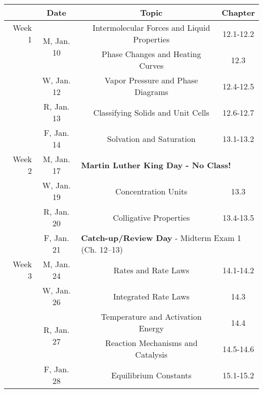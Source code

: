 \documentclass[12pt, letterpaper]{article}
\begin{document}
\begin{tabular}{rcccc}
	& Date && Topic & Chapter\\
	\midrule
	Week 1 & \multirow{2}{*}{M, Jan. 10}& & Intermolecular Forces and Liquid Properties & 12.1-12.2\\
	& & & Phase Changes and Heating Curves & 12.3\\
	& W, Jan. 12&& Vapor Pressure and Phase Diagrams & 12.4-12.5\\
	& R, Jan. 13&& Classifying Solids and Unit Cells & 12.6-12.7\\
	& F, Jan. 14&& Solvation and Saturation & 13.1-13.2\\
	\midrule
	Week 2 & M, Jan. 17& \multicolumn{3}{l}{\textbf{Martin Luther King Day - No Class!}}\\
	& W, Jan. 19&& Concentration Units & 13.3\\
	& R, Jan. 20&& Colligative Properties & 13.4-13.5\\
	& F, Jan. 21& \multicolumn{3}{l}{\textbf{Catch-up/Review Day} - Midterm Exam 1 (Ch. 12--13)}\\
	\midrule
	Week 3 & M, Jan. 24&& Rates and Rate Laws & 14.1-14.2\\
	& W, Jan. 26&& Integrated Rate Laws & 14.3\\
	& \multirow{2}{*}{R, Jan. 27}& & Temperature and Activation Energy & 14.4\\
	& & & Reaction Mechanisms and Catalysis & 14.5-14.6\\
	& F, Jan. 28&& Equilibrium Constants & 15.1-15.2\\
\end{tabular}
\end{document}
